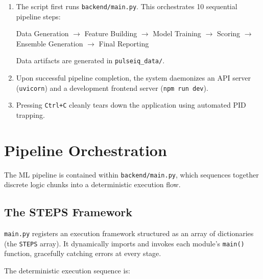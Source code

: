 \documentclass[12pt, a4paper, oneside]{report}
\begin{document}
\begin{enumerate}
    \item The script first runs \texttt{backend/main.py}. This orchestrates 10 sequential pipeline steps:
    \begin{center}
        Data Generation $\rightarrow$ Feature Building $\rightarrow$ Model Training $\rightarrow$ Scoring $\rightarrow$ Ensemble Generation $\rightarrow$ Final Reporting
    \end{center}
    Data artifacts are generated in \texttt{pulseiq\_data/}.

    \item Upon successful pipeline completion, the system daemonizes an API server (\texttt{uvicorn}) and a development frontend server (\texttt{npm run dev}).

    \item Pressing \texttt{Ctrl+C} cleanly tears down the application using automated PID trapping.
\end{enumerate}


\chapter{Pipeline Orchestration}
\label{ch:pipeline}

The ML pipeline is contained within \texttt{backend/main.py}, which sequences together discrete logic chunks into a deterministic execution flow.

\section{The STEPS Framework}
\label{sec:steps}

\texttt{main.py} registers an execution framework structured as an array of dictionaries (the \texttt{STEPS} array). It dynamically imports and invokes each module's \texttt{main()} function, gracefully catching errors at every stage.

The deterministic execution sequence is:
\end{document}
